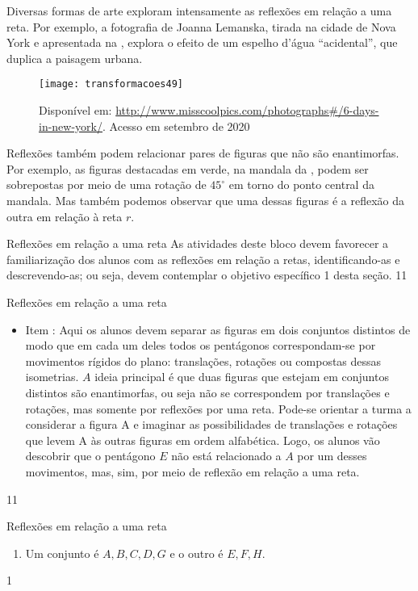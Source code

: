 Diversas formas de arte exploram intensamente as reflexões em relação a uma reta. Por exemplo, a fotografia de Joanna Lemanska, tirada na cidade de Nova York e apresentada na , explora o efeito de um espelho d’água “acidental”, que duplica a paisagem urbana.

\begin{figure}[H]
\centering

\texttt{[image: transformacoes49]}
\caption{Disponível em: \url{http://www.misscoolpics.com/photographs\#/6-days-in-new-york/}. Acesso em setembro de 2020}
\label{transformacoes49}
\end{figure}

Reflexões também podem relacionar pares de figuras que não são enantimorfas. Por exemplo, as figuras destacadas em verde, na mandala da , podem ser sobrepostas por meio de uma rotação de $45^{\circ}$ em torno do ponto central da mandala.  Mas também podemos observar que uma dessas figuras é a reflexão da outra em relação à reta $r$.
\clearpage
\begin{objectives}{Reflexões em relação a uma reta}
{
As atividades deste bloco devem favorecer a familiarização dos alunos com as reflexões em relação a retas, identificando-as e descrevendo-as; ou seja, devem contemplar o objetivo específico 1 desta seção. 
}{1}{1}
\end{objectives}
\begin{sugestions}{Reflexões em relação a uma reta}
{
\begin{itemize}
\item Item : Aqui os alunos devem separar as figuras em dois conjuntos distintos de modo que em cada um deles todos os pentágonos correspondam-se por movimentos rígidos do plano: translações, rotações ou compostas dessas isometrias. $A$ ideia principal é que duas figuras que estejam em conjuntos distintos são enantimorfas, ou seja não se correspondem por translações e rotações, mas somente por reflexões por uma reta. Pode-se orientar a turma a considerar a figura A e imaginar as possibilidades de translações e rotações que levem A às outras figuras em ordem alfabética. Logo, os alunos vão descobrir que o pentágono $E$ não está relacionado a $A$ por um desses movimentos, mas, sim, por meio de reflexão em relação a uma reta. 
\end{itemize}
}{1}{1}
\end{sugestions}
\begin{answer}{Reflexões em relação a uma reta}
{
\begin{enumerate}
\item Um conjunto é ${A, B, C, D, G}$ e o outro é ${E, F, H}$. 
\end{enumerate}
}{1}
\end{answer}
